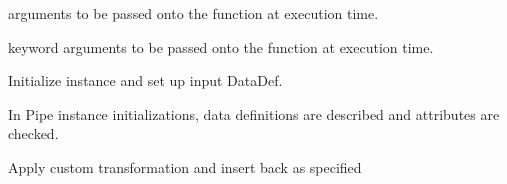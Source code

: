 \documentclass[letterpaper,10pt,english]{sphinxmanual}
\begin{document}
\begin{fulllineitems}
\begin{fulllineitems}
\begin{quote}
\begin{description}
\end{description}\end{quote}

\end{fulllineitems}


\begin{fulllineitems}
\label{\detokenize{beginners-guide:dalio.pipe.col_generation._ColGeneration._args}}
arguments to be passed onto the function at execution time.

\end{fulllineitems}


\begin{fulllineitems}
\label{\detokenize{beginners-guide:dalio.pipe.col_generation._ColGeneration._kwargs}}
keyword arguments to be passed onto the function at
execution time.

\end{fulllineitems}


\begin{fulllineitems}
\label{\detokenize{beginners-guide:dalio.pipe.col_generation._ColGeneration.__init__}}
Initialize instance and set up input DataDef.

In Pipe instance initializations, data definitions are described
and attributes are checked.

\end{fulllineitems}


\begin{fulllineitems}
\label{\detokenize{beginners-guide:dalio.pipe.col_generation._ColGeneration.transform}}
Apply custom transformation and insert back as specified


\end{fulllineitems}
\end{fulllineitems}
\end{document}
